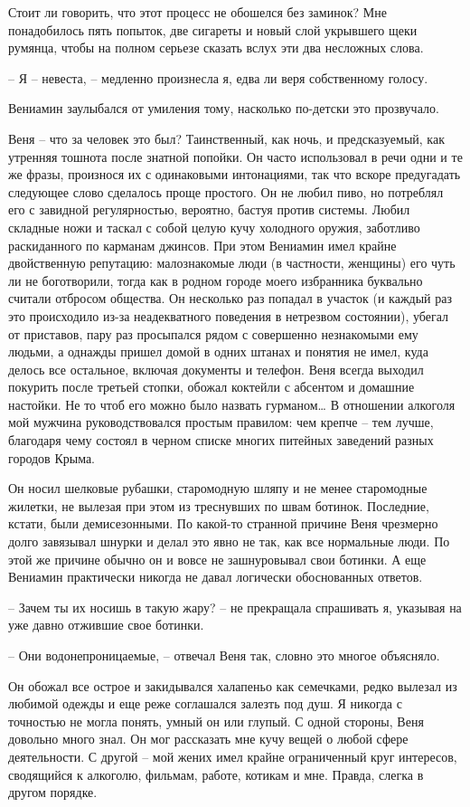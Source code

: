 \documentclass[
]{book}
\begin{document}
Стоит ли говорить, что этот процесс не обошелся без заминок? Мне понадобилось пять попыток, две сигареты и новый слой укрывшего щеки румянца, чтобы на полном серьезе сказать вслух эти два несложных слова.

-- Я -- невеста, -- медленно произнесла я, едва ли веря собственному голосу.

Вениамин заулыбался от умиления тому, насколько по-детски это прозвучало.

Веня -- что за человек это был? Таинственный, как ночь, и предсказуемый, как утренняя тошнота после знатной попойки. Он часто использовал в речи одни и те же фразы, произнося их с одинаковыми интонациями, так что вскоре предугадать следующее слово сделалось проще простого. Он не любил пиво, но потреблял его с завидной регулярностью, вероятно, бастуя против системы. Любил складные ножи и таскал с собой целую кучу холодного оружия, заботливо раскиданного по карманам джинсов. При этом Вениамин имел крайне двойственную репутацию: малознакомые люди (в частности, женщины) его чуть ли не боготворили, тогда как в родном городе моего избранника буквально считали отбросом общества. Он несколько раз попадал в участок (и каждый раз это происходило из-за неадекватного поведения в нетрезвом состоянии), убегал от приставов, пару раз просыпался рядом с совершенно незнакомыми ему людьми, а однажды пришел домой в одних штанах и понятия не имел, куда делось все остальное, включая документы и телефон. Веня всегда выходил покурить после третьей стопки, обожал коктейли с абсентом и домашние настойки. Не то чтоб его можно было назвать гурманом\ldots{} В отношении алкоголя мой мужчина руководствовался простым правилом: чем крепче -- тем лучше, благодаря чему состоял в черном списке многих питейных заведений разных городов Крыма.

Он носил шелковые рубашки, старомодную шляпу и не менее старомодные жилетки, не вылезая при этом из треснувших по швам ботинок. Последние, кстати, были демисезонными. По какой-то странной причине Веня чрезмерно долго завязывал шнурки и делал это явно не так, как все нормальные люди. По этой же причине обычно он и вовсе не зашнуровывал свои ботинки. А еще Вениамин практически никогда не давал логически обоснованных ответов.

-- Зачем ты их носишь в такую жару? -- не прекращала спрашивать я, указывая на уже давно отжившие свое ботинки.

-- Они водонепроницаемые, -- отвечал Веня так, словно это многое объясняло.

Он обожал все острое и закидывался халапеньо как семечками, редко вылезал из любимой одежды и еще реже соглашался залезть под душ. Я никогда с точностью не могла понять, умный он или глупый. С одной стороны, Веня довольно много знал. Он мог рассказать мне кучу вещей о любой сфере деятельности. С другой -- мой жених имел крайне ограниченный круг интересов, сводящийся к алкоголю, фильмам, работе, котикам и мне. Правда, слегка в другом порядке.
\end{document}
